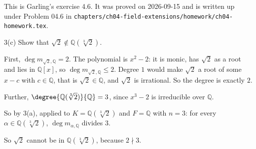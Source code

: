 \documentclass[11pt]{article}
\begin{document}
\begin{solution}
  This is Garling's exercise 4.6. It was proved on 2026-09-15 and is written up
  under Problem 04.6 in
  \texttt{chapters/ch04-field-extensions/homework/ch04-homework.tex}.
\end{solution}

\begin{problem}{3(c)}
  Show that $\sqrt{2} \notin \mathbb{Q}(\sqrt[3]{2})$.
\end{problem}

\begin{solution}
  First, $\deg m_{\sqrt{2},\mathbb{Q}} = 2$. The polynomial is $x^{2} - 2$: it
  is monic, has $\sqrt{2}$ as a root and lies in $\mathbb{Q}[x]$, so
  $\deg m_{\sqrt{2},\mathbb{Q}} \leq 2$. Degree $1$ would make $\sqrt{2}$ a root
  of some $x - c$ with $c \in \mathbb{Q}$, that is $\sqrt{2} \in \mathbb{Q}$,
  and $\sqrt{2}$ is irrational. So the degree is exactly $2$.

  Further, $\degree{\mathbb{Q}(\sqrt[3]{2})}{\mathbb{Q}} = 3$, since
  $x^{3} - 2$ is irreducible over $\mathbb{Q}$.

  So by 3(a), applied to $K = \mathbb{Q}(\sqrt[3]{2})$ and $F = \mathbb{Q}$ with
  $n = 3$: for every $\alpha \in \mathbb{Q}(\sqrt[3]{2})$,
  $\deg m_{\alpha,\mathbb{Q}}$ divides $3$.

  So $\sqrt{2}$ cannot be in $\mathbb{Q}(\sqrt[3]{2})$, because
  $2 \nmid 3$.
\end{solution}
\end{document}
